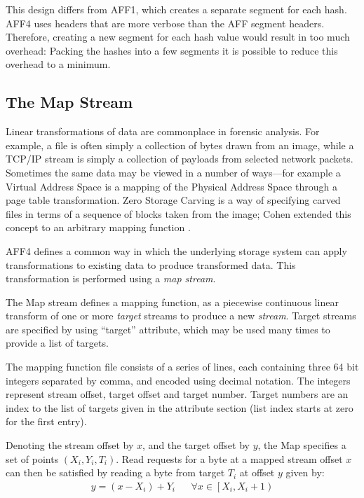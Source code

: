 \documentclass[10pt, conference]{IEEEtran}
\begin{document}
This design differs from AFF1, which creates a separate segment for
each hash. AFF4 uses headers that are more verbose than the AFF
segment headers. Therefore, creating a new segment for each hash value
would result in too much overhead: Packing the hashes into a few
segments it is possible to reduce this overhead to a minimum.

\subsection{The Map Stream}
\label{map_stream}
Linear transformations of data are commonplace in forensic
analysis. For example, a file is often simply a collection of bytes
drawn from an image, while a TCP/IP stream is simply a collection of
payloads from selected network packets. 
Sometimes the same data may be
viewed in a number of ways---for example a Virtual Address Space is a
mapping of the Physical Address Space through a page table
transformation.  Zero Storage Carving \cite{Meijer2006} is a way of
specifying carved files in terms of a sequence of blocks taken from
the image; Cohen extended this concept to an arbitrary
mapping function\cite{Cohen2007} . 

AFF4 defines a common way in
which the underlying storage system can apply transformations to
existing data to produce transformed data. This transformation is
performed using a \emph{map stream}.

The Map stream defines a mapping function, as a piecewise continuous
linear transform of one or more {\em target} streams to produce a new
{\em stream}. Target streams are specified by using ``target''
attribute, which may be used many times to provide a list of targets.

The mapping function file consists of a series of lines, each
containing three 64 bit integers separated by comma, and encoded using
decimal notation. The integers represent stream offset, target offset
and target number. Target numbers are an index to the list of targets
given in the attribute section (list index starts at zero for the
first entry).

Denoting the stream offset by $x$, and the target offset by $y$, the
Map specifies a set of points $(X_i,Y_i,T_i)$. Read requests for a
byte at a mapped stream offset $x$ can then be satisfied by reading a
byte from target $T_i$ at offset $y$ given by:
\begin{eqnarray}
y = (x - X_i) + Y_i & &
\forall x \in \left [X_i, X_i+1 \right )
\end{eqnarray}
\end{document}
